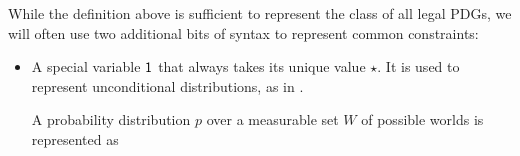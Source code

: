\documentclass{article}
\newcommand{\commentout}[1]{\ignorespaces}
\newcommand{\none}{\varobslash}
\newcommand{\bmu}{\boldsymbol{\mu}}
\newcommand{\V}{\mathcal V}
\newcommand{\N}{\mathcal N}
\newcommand{\Ed}{\mathcal E}
\newcommand{\modelnamehyper}{probabilistic dependency hypergraph}
\newcommand{\MN}{PDG}
\newcommand{\MNH}{PDH}
\newcommand{\MNs}{\MN s}
\numberwithin{equation}{section}
\begin{document}
\begin{notfocus}
	\commentout{Here $\underline\Delta(X)$ is the collection of sub-distributions on $X$ --- i.e., distributions on $X \cup \{\none\}$, where $\none$ is a `null' element. We will call a \MN\ \emph{strict} if $\bmu$ never assigns mass to $\none$. So far only example \ref{ex:teacher} makes use of this, but we explore the implications carefully in \Cref{sec:full-model}.}
	
%

	While the definition above is sufficient to represent the class of all legal \MNs, 
	we will often use two additional bits of syntax to represent common constraints: 
	\begin{itemize}
		\item A special variable $\sf 1$ that always takes its unique value $\star$. It is used to represent unconditional distributions, as in . 
		\begin{vfull}
		\begin{examplex}\label{ex:worldsonly}
			A probability distribution $p$ over a measurable set $W$ of possible worlds is represented as 
			\begin{center}
\end{center}
\end{examplex}
\end{vfull}
\end{itemize}
\end{notfocus}
\end{document}
